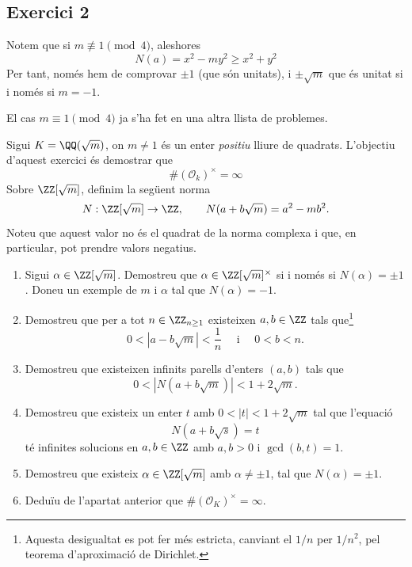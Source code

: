 \documentclass[11pt, a4paper]{article}
\begin{document}
    \subsection{Exercici 2}
    Notem que si $m\not\equiv1\pmod 4$, aleshores 
    \[
        N(a)=x^2-my^2\geq x^2+y^2
    \]
    Per tant, només hem de comprovar $\pm1$ (que són unitats), i $\pm \sqrt{m}$ que és unitat si i només si $m=-1$.\par
    El cas $m\equiv 1\pmod 4$ ja s'ha fet en una altra llista de problemes.
    \newpage
    \begin{tcolorbox}[title=\section{FP 4 Exercici 3}]
        Sigui $K=\QQ(\sqrt{m})$, on $m\neq1$ és un enter \emph{positiu} lliure de quadrats. L'objectiu d'aquest exercici és demostrar que
        \[
            \#(\mathcal{O}_k)^\times=\infty
        \]
        Sobre $\ZZ[\sqrt{m}]$, definim la següent norma
        \[
            N:\ZZ[\sqrt{m}]\to\ZZ,\qquad N(a+b\sqrt{m})=a^2-mb^2.
        \]
        Noteu que aquest valor no és el quadrat de la norma complexa i que, en particular, pot prendre valors negatius.
        \begin{enumerate}
            \item Sigui $\alpha\in\ZZ[\sqrt{m}]$. Demostreu que $\alpha\in\ZZ[\sqrt{m}]^\times$ si i només si $N(\alpha)=\pm1$. Doneu un exemple de $m$ i $\alpha$ tal que $N(\alpha)=-1$.
            \item Demostreu que per a tot $n\in\ZZ_{n\geq1}$ existeixen $a,b\in\ZZ$ tals que\footnote{Aquesta desigualtat es pot fer més estricta, canviant el $1/n$ per $1/n^2$, pel teorema d'aproximació de Dirichlet.}
            \begin{equation}\label{FP4P3 aproximacio de arrels quadrades}
                0<|a-b\sqrt{m}|<\frac{1}{n}\quad\text{ i }\quad 0<b<n.
            \end{equation}
            \item Demostreu que existeixen infinits parells d'enters $(a,b)$ tals que
            \begin{equation}\label{FP4P3 bones aproximacions tenen norma petita}
                0<|N(a+b\sqrt{m})|<1+2\sqrt{m}.
            \end{equation}
            \item Demostreu que existeix un enter $t$ amb $0<|t|<1+2\sqrt{m}$ tal que l'equació
            \[
                N(a+b\sqrt{s})=t
            \]
            té infinites solucions en $a,b\in\ZZ$ amb $a,b>0$ i $\gcd(b,t)=1$.
            \item Demostreu que existeix $\alpha \in\ZZ[\sqrt{m}]$ amb $\alpha\neq \pm1$, tal que $N(\alpha)=\pm1$.
            \item Deduïu de l'apartat anterior que $\#(\mathcal{O}_K)^\times=\infty$.
        \end{enumerate}
    \end{tcolorbox}
\end{document}
